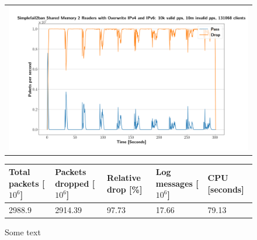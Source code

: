 \begin{figure}[p]
	\label{fig:simplefail2ban:shm:or}
	\centering
	\scriptsize
	\begin{tabular}{c}
    	\centerline{\includegraphics[width=1.2\textwidth]{images/simplefail2ban_shm_2r_or_ipv46_v10k_iv10m_c131068.png}}
	\end{tabular}
	\begin{tabular}{lllll}
		\toprule
		\textbf{Total packets [$10^6$]} & \textbf{Packets dropped [$10^6$]} & \textbf{Relative drop [\%]} & \textbf{Log messages [$10^6$]} & \textbf{CPU [seconds]} \\ \midrule 
		2988.9 & 2914.39 & 97.73 & 17.66 & 79.13 \\
		\bottomrule
	\end{tabular}
	\caption[Simplefail2ban Shared Memory 2 Readers with Overwrite]{Some text}
\end{figure}

